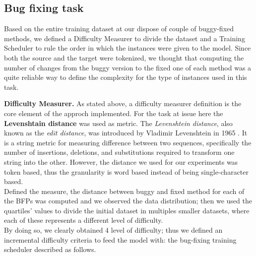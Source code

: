 \subsection{Bug fixing task}
Based on the entire training dataset at our dispose of couple of buggy-fixed methods, we defined a Difficulty Measurer to divide the dataset
and a Training Scheduler to rule the order in which the instances were given to the model. Since both the source and the target
were tokenized, we thought that computing the number of changes from the buggy version to the fixed one of each method was a quite reliable
way to define the complexity for the type of instances used in this task.\newline


\noindent\textbf{Difficulty Measurer.} As stated above, a difficulty measurer definition is the core element of the approch implemented.
For the task at issue here the \textbf{Levenshtain distance} was used as metric. The \textit{Levenshtein distance}, also known as the \textit{edit distance}, 
was introduced by Vladimir Levenshtein in 1965 \cite{Levenshtein_SPD66}. It is a string metric for measuring difference between two sequences, specifically the number of insertions, deletions, and substitutions
required to transform one string into the other. However, the distance we used for our experiments was token based, thus the granularity is word based instead of being single-character based.\\
Defined the measure, the distance between buggy and fixed method for each of the BFPs was computed and we observed the data distribution; then we used the quartiles' values to divide the initial dataset in multiples
smaller datasets, where each of these represents a different level of difficulty.\\
By doing so, we clearly obtained 4 level of difficulty; thus we defined an incremental difficulty criteria to feed the model with: 
the bug-fixing training scheduler described as follows.\newline

